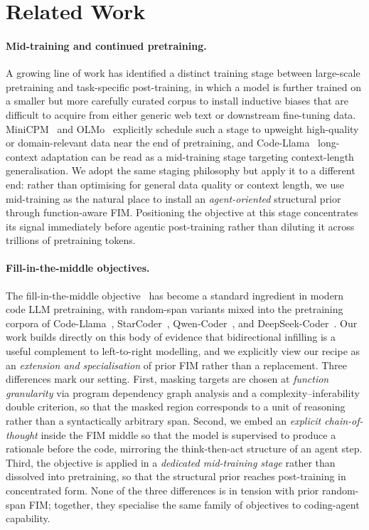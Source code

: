 \section{Related Work}
\label{sec:related}

\paragraph{Mid-training and continued pretraining.}
A growing line of work has identified a distinct training stage between
large-scale pretraining and task-specific post-training, in which a model is
further trained on a smaller but more carefully curated corpus to install
inductive biases that are difficult to acquire from either generic web text
or downstream fine-tuning data. MiniCPM~\citep{minicpm} and
OLMo~\citep{olmo} explicitly schedule such a stage to upweight high-quality
or domain-relevant data near the end of pretraining, and
Code-Llama~\citep{codellama} long-context adaptation can be read as a
mid-training stage targeting context-length generalisation. We adopt the
same staging philosophy but apply it to a different end: rather than
optimising for general data quality or context length, we use mid-training
as the natural place to install an \textit{agent-oriented} structural prior
through function-aware FIM. Positioning the objective at this stage
concentrates its signal immediately before agentic post-training rather
than diluting it across trillions of pretraining tokens.

\paragraph{Fill-in-the-middle objectives.}
The fill-in-the-middle objective~\citep{bavarian2022fim} has become a
standard ingredient in modern code LLM pretraining, with random-span
variants mixed into the pretraining corpora of
Code-Llama~\citep{codellama}, StarCoder~\citep{starcoder},
Qwen-Coder~\citep{qwencoder}, and DeepSeek-Coder~\citep{deepseekcoder}.
Our work builds directly on this body of evidence that bidirectional
infilling is a useful complement to left-to-right modelling, and we
explicitly view our recipe as an \textit{extension and specialisation} of
prior FIM rather than a replacement. Three differences mark our setting.
First, masking targets are chosen at \textit{function granularity} via
program dependency graph analysis and a complexity--inferability double
criterion, so that the masked region corresponds to a unit of reasoning
rather than a syntactically arbitrary span. Second, we embed an
\textit{explicit chain-of-thought} inside the FIM middle so that the
model is supervised to produce a rationale before the code, mirroring the
think-then-act structure of an agent step. Third, the objective is applied
in a \textit{dedicated mid-training stage} rather than dissolved into
pretraining, so that the structural prior reaches post-training in
concentrated form. None of the three differences is in tension with prior
random-span FIM; together, they specialise the same family of objectives
to coding-agent capability.

